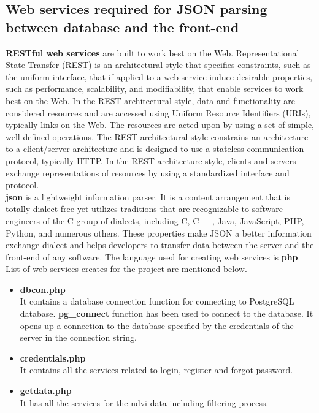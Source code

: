 \subsection{Web services required for JSON parsing between database and the front-end}

\textbf{RESTful web services} are built to work best on the Web. Representational State Transfer (REST) is an architectural style that specifies constraints, such as the uniform interface, that if applied to a web service induce desirable properties, such as performance, scalability, and modifiability, that enable services to work best on the Web. In the REST architectural style, data and functionality are considered resources and are accessed using Uniform Resource Identifiers (URIs), typically links on the Web. The resources are acted upon by using a set of simple, well-defined operations. The REST architectural style constrains an architecture to a client/server architecture and is designed to use a stateless communication protocol, typically HTTP. In the REST architecture style, clients and servers exchange representations of resources by using a standardized interface and protocol. \cite{RESTful_web_services} \\

\textbf{\gls{json}} is a lightweight information parser. It is a content arrangement that is totally dialect free yet utilizes traditions that are recognizable to software engineers of the C-group of dialects, including C, C++, Java, JavaScript, PHP, Python, and numerous others. These properties make JSON a better information exchange dialect and helps developers to transfer data between the server and the front-end of any software. The language used for creating web services is \textbf{\gls{php}}. List of web services creates for the project are mentioned below.

\begin{itemize}
    \item \textbf{dbcon.php} \\
    It contains a database connection function for connecting to PostgreSQL database. \textbf{pg\_connect} function has been used to connect to the database. It opens up a connection to the database specified by the credentials of the server in the connection string. \\
    
    \item \textbf{credentials.php} \\
    It contains all the services related to login, register and forgot password. \\
    
    \item \textbf{getdata.php} \\
    It has all the services for the ndvi data including filtering process. \\
\end{itemize}

